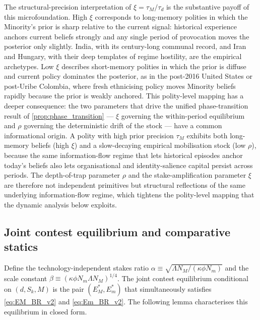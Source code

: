 \documentclass[11pt,twoside]{extarticle}
\begin{document}
The structural-precision interpretation of $\xi=\tau_M/\tau_d$ is the substantive payoff of this microfoundation. High $\xi$ corresponds to long-memory polities in which the Minority's prior is sharp relative to the current signal: historical experience anchors current beliefs strongly and any single period of provocation moves the posterior only slightly. India, with its century-long communal record, and Iran and Hungary, with their deep templates of regime hostility, are the empirical archetypes. Low $\xi$ describes short-memory polities in which the prior is diffuse and current policy dominates the posterior, as in the post-2016 United States or post-Uribe Colombia, where fresh ethnicising policy moves Minority beliefs rapidly because the prior is weakly anchored. This polity-level mapping has a deeper consequence: the two parameters that drive the unified phase-transition result of \autoref{prop:phase_transition} --- $\xi$ governing the within-period equilibrium and $\rho$ governing the deterministic drift of the stock --- have a common informational origin. A polity with high prior precision $\tau_M$ exhibits both long-memory beliefs (high $\xi$) and a slow-decaying empirical mobilisation stock (low $\rho$), because the same information-flow regime that lets historical episodes anchor today's beliefs also lets organisational and identity-salience capital persist across periods. The depth-of-trap parameter $\rho$ and the stake-amplification parameter $\xi$ are therefore not independent primitives but structural reflections of the same underlying information-flow regime, which tightens the polity-level mapping that the dynamic analysis below exploits.

\subsection{Joint contest equilibrium and comparative statics}

Define the technology-independent stakes ratio $\alpha\equiv\sqrt{\Lambda N_M/(\kappa\phi N_m)}$ and the scale constant $\beta\equiv(\kappa\phi N_m\Lambda N_M)^{1/4}$. The joint contest equilibrium conditional on $(d,S_k,M)$ is the pair $(E_M^*,E_m^*)$ that simultaneously satisfies \autoref{eq:EM_BR_v2} and \autoref{eq:Em_BR_v2}. The following lemma characterises this equilibrium in closed form.
\end{document}
